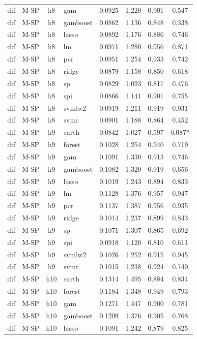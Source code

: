 \begin{ThreePartTable}
\begin{longtable}[t]{llclcccc}
dif & M-SP & h8 & gam & 0.0925 & 1.220 & 0.901 & 0.547\\
dif & M-SP & h8 & gamboost & 0.0862 & 1.136 & 0.848 & 0.338\\
dif & M-SP & h8 & lasso & 0.0892 & 1.176 & 0.886 & 0.746\\
dif & M-SP & h8 & lm & 0.0971 & 1.280 & 0.956 & 0.871\\
dif & M-SP & h8 & pcr & 0.0951 & 1.254 & 0.933 & 0.742\\
dif & M-SP & h8 & ridge & 0.0879 & 1.158 & 0.850 & 0.618\\
dif & M-SP & h8 & sp & 0.0829 & 1.093 & 0.817 & 0.476\\
dif & M-SP & h8 & spi & 0.0866 & 1.141 & 0.901 & 0.755\\
dif & M-SP & h8 & svmlw2 & 0.0919 & 1.211 & 0.919 & 0.931\\
dif & M-SP & h8 & svmr & 0.0901 & 1.188 & 0.864 & 0.452\\
\addlinespace
dif & M-SP & h9 & earth & 0.0842 & 1.027 & 0.597 & 0.087*\\
dif & M-SP & h9 & forest & 0.1028 & 1.254 & 0.940 & 0.719\\
dif & M-SP & h9 & gam & 0.1091 & 1.330 & 0.913 & 0.746\\
dif & M-SP & h9 & gamboost & 0.1082 & 1.320 & 0.919 & 0.656\\
dif & M-SP & h9 & lasso & 0.1019 & 1.243 & 0.894 & 0.833\\
dif & M-SP & h9 & lm & 0.1128 & 1.376 & 0.957 & 0.947\\
dif & M-SP & h9 & pcr & 0.1137 & 1.387 & 0.956 & 0.935\\
dif & M-SP & h9 & ridge & 0.1014 & 1.237 & 0.899 & 0.843\\
dif & M-SP & h9 & sp & 0.1071 & 1.307 & 0.865 & 0.692\\
dif & M-SP & h9 & spi & 0.0918 & 1.120 & 0.810 & 0.611\\
dif & M-SP & h9 & svmlw2 & 0.1026 & 1.252 & 0.915 & 0.945\\
dif & M-SP & h9 & svmr & 0.1015 & 1.238 & 0.924 & 0.740\\
\addlinespace
dif & M-SP & h10 & earth & 0.1314 & 1.495 & 0.884 & 0.834\\
dif & M-SP & h10 & forest & 0.1184 & 1.348 & 0.949 & 0.793\\
dif & M-SP & h10 & gam & 0.1271 & 1.447 & 0.900 & 0.781\\
dif & M-SP & h10 & gamboost & 0.1209 & 1.376 & 0.905 & 0.768\\
dif & M-SP & h10 & lasso & 0.1091 & 1.242 & 0.879 & 0.825\\

\end{longtable}
\end{ThreePartTable}
